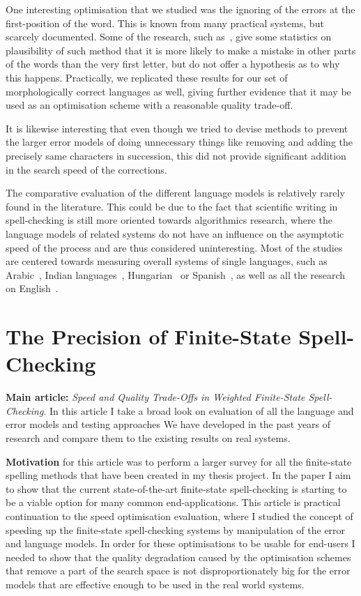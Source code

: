 \documentclass[officiallayout,draft]{unihelcompling}
\begin{document}
One interesting optimisation that we studied was the ignoring of the errors at
the first-position of the word. This is known from many practical systems, but
scarcely documented. Some of the research, such as~\citet{bhagat2007spelling},
give some statistics on plausibility of such method that it is more likely to
make a mistake in other parts of the words than the very first letter, but do
not offer a hypothesis as to why this happens.  Practically, we replicated
these results for our set of morphologically correct languages as well, giving
further evidence that it may be used as an optimisation scheme with a
reasonable quality trade-off.

It is likewise interesting that even though we tried to devise methods to
prevent the larger error models of doing unnecessary things like removing and
adding the precisely same characters in succession, this did not provide
significant addition in the search speed of the corrections.

The comparative evaluation of the different language models is relatively
rarely found in the literature. This could be due to the fact that scientific
writing in spell-checking is still more oriented towards algorithmics research,
where the language models of related systems do not have an influence on the
asymptotic speed of the process and are thus considered uninteresting.  Most of
the studies are centered towards measuring overall systems of single languages,
such as Arabic~\citep{attia2013improved}, Indian
languages~\citep{chaudhuri2002towards}, Hungarian~\citep{tron2005hunmorph} or
Spanish~\cite{otero2007contextual}, as well as all the research on
English~\citep{mitton1987spelling}.

\section{The Precision of Finite-State Spell-Checking}
\label{sec:quality}

\textbf{Main article:} \emph{Speed and Quality Trade-Offs in Weighted
Finite-State Spell-Checking}. In this article I take a broad look on evaluation
of all the language and error models and testing approaches We have developed
in the past years of research and compare them to the existing results on real
systems.

\textbf{Motivation} for this article was to perform a larger survey for all the
finite-state spelling methods that have been created in my thesis project. In
the paper I aim to show that the current state-of-the-art finite-state
spell-checking is starting to be a viable option for many common
end-applications. This article is practical continuation to the speed
optimisation evaluation, where I studied the concept of speeding up the
finite-state spell-checking systems by manipulation of the error and language
models. In order for these optimisations to be usable for end-users I needed to
show that the quality degradation caused by the optimisation schemes that
remove a part of the search space is not disproportionately big for the error
models that are effective enough to be used in the real world systems.
\end{document}
